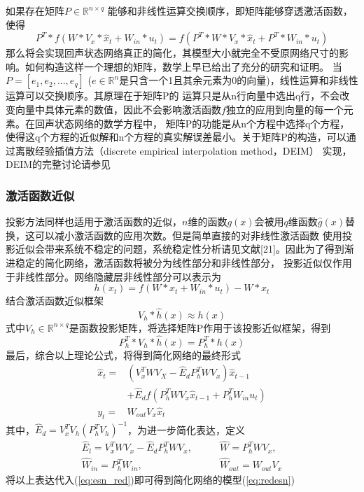 如果存在矩阵\(P \in \mathbb{R}^{n \times q}\) 能够和非线性运算交换顺序，即矩阵能够穿透激活函数，使得
\begin{equation}
	P^T*f(W*V_x *\widehat{x}_t + W_{in} *u_t) = f(P^T*W*V_x*\widehat{x}_t + P^T *W_{in}* u_t)	
\end{equation}
那么将会实现回声状态网络真正的简化，其模型大小就完全不受原网络尺寸的影响。如何构造这样一个理想的矩阵，数学上早已给出了充分的研究和证明。
当\(P = [e_1,e_2,...,e_q]\) (\(e \in \mathbb{R}^n\)是只含一个1且其余元素为0的向量)，线性运算和非线性运算可以交换顺序。其原理在于矩阵P的
运算只是从n行向量中选出q行，不会改变向量中具体元素的数值，因此不会影响激活函数\(f\)独立的应用到向量的每一个元素。在回声状态网络的数学方程中，
矩阵P的功能是从n个方程中选择q个方程，使得这q个方程的近似解和n个方程的真实解误差最小。关于矩阵P的构造，可以通过离散经验插值方法（discrete empirical interpolation method，DEIM）
实现，DEIM的完整讨论请参见\citing{}

\subsubsection{激活函数近似}
投影方法同样也适用于激活函数的近似，\(n\)维的函数\(g(x)\)会被用\(q\)维函数\(\widehat{g}(x)\)替换，这可以减小激活函数的应用次数。但是简单直接的对非线性激活函数
使用投影近似会带来系统不稳定的问题，系统稳定性分析请见文献[21]。因此为了得到渐进稳定的简化网络，激活函数将被分为线性部分和非线性部分，
投影近似仅作用于非线性部分。网络隐藏层非线性部分可以表示为
\begin{equation}\label{eq:h(x)}
	h(x_t) = f(W*x_t + W_{in}*u_t) - W*x_t
\end{equation}
结合激活函数近似框架
\begin{equation}
	V_h*\widehat{h}(x) \approx h(x)
\end{equation}
式中\(V_h \in \mathbb{R}^{n \times q}\)是函数投影矩阵，将选择矩阵P作用于该投影近似框架，得到
\begin{equation}\label{eq:Pselect}
	P_h^T*V_h*\widehat{h}(x) = P_h^T*h(x)
\end{equation}
最后，综合以上理论公式，将得到简化网络的最终形式
\begin{equation}\label{eq:esn_red}
	\begin{split}
		\widehat{x}_t  = &(V_x^T W V_X - \widehat{E}_d P_h^T W V_x)\widehat{x}_{t-1}  \\
					     & + \widehat{E}_{d} f(P_h^T W V_x \widehat{x}_{t-1} + P_h^{T} W_{in} u_{t})	\\
				y_t    = &W_{out} V_x \widehat{x}_t
	\end{split}
\end{equation}
其中，\(\widehat{E}_d = V_x^T V_h (P_h^TV_h)^{-1}\)，为进一步简化表达，定义
\begin{equation}
	\begin{split}
		\widehat{E}_l = V_x^T W V_x - \widehat{E}_d P_h^T W V_x,	\qquad &\widehat{W} = P_h^T W V_x,		\\
		\widehat{W}_{in} = P_h^T W_{in},							\qquad &\widehat{W}_{out} = W_{out}V_x
	\end{split}
\end{equation}
将以上表达代入(\ref{eq:esn_red})即可得到简化网络的模型(\ref{eq:redesn})

